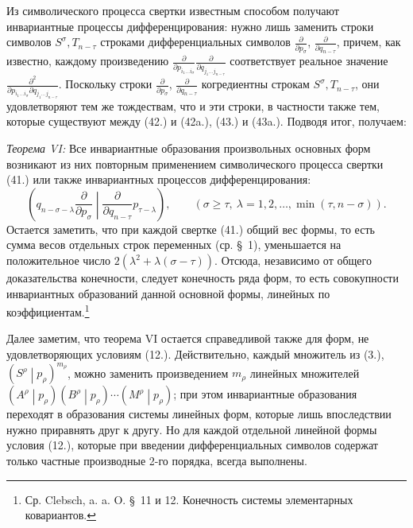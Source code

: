 \documentclass[11pt]{article}
\newcommand{\pair}[2]{\left(#1\middle|#2\right)}
\begin{document}
Из символического процесса свертки известным способом получают инвариантные процессы дифференцирования: нужно лишь заменить строки символов $S^\sigma,T_{n-\tau}$ строками дифференциальных символов $\frac{\partial}{\partial p_\sigma}$, $\frac{\partial}{\partial q_{n-\tau}}$, причем, как известно, каждому произведению $\frac{\partial}{\partial p_{i_1\ldots i_\sigma}}\frac{\partial}{\partial q_{j_1\ldots j_{n-\tau}}}$ соответствует реальное значение $\frac{\partial^2}{\partial p_{i_1\ldots i_\sigma}\partial q_{j_1\ldots j_{n-\tau}}}$. Поскольку строки $\frac{\partial}{\partial p_\sigma}$, $\frac{\partial}{\partial q_{n-\tau}}$ когредиентны строкам $S^\sigma,T_{n-\tau}$, они удовлетворяют тем же тождествам, что и эти строки, в частности также тем, которые существуют между (42.) и (42a.), (43.) и (43a.). Подводя итог, получаем:

\emph{Теорема VI:} Все инвариантные образования произвольных основных форм возникают из них повторным применением символического процесса свертки (41.) или также инвариантных процессов дифференцирования:
\begin{equation}
 \left(q_{n-\sigma-\lambda}\frac{\partial}{\partial p_\sigma}
 \middle|\frac{\partial}{\partial q_{n-\tau}}p_{\tau-\lambda}\right),
 \qquad(\sigma\ge\tau,\ \lambda=1,2,\ldots,\min(\tau,n-\sigma)).
\tag{45}
\end{equation}
Остается заметить, что при каждой свертке (41.) общий вес формы, то есть сумма весов отдельных строк переменных (ср. \S\ 1), уменьшается на положительное число $2(\lambda^2+\lambda(\sigma-\tau))$. Отсюда, независимо от общего доказательства конечности, следует конечность ряда форм, то есть совокупности инвариантных образований данной основной формы, линейных по коэффициентам.\footnote{Ср. Clebsch, a. a. O. \S\ 11 и 12. Конечность системы элементарных ковариантов.}

Далее заметим, что теорема VI остается справедливой также для форм, не удовлетворяющих условиям (12.). Действительно, каждый множитель из (3.), $\pair{S^\rho}{p_\rho}^{m_\rho}$, можно заменить произведением $m_\rho$ линейных множителей $\pair{A^\rho}{p_\rho}\pair{B^\rho}{p_\rho}\cdots\pair{M^\rho}{p_\rho}$; при этом инвариантные образования переходят в образования системы линейных форм, которые лишь впоследствии нужно приравнять друг к другу. Но для каждой отдельной линейной формы условия (12.), которые при введении дифференциальных символов содержат только частные производные 2-го порядка, всегда выполнены.
\end{document}
